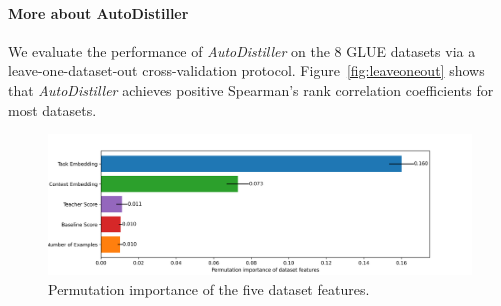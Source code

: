 \documentclass[11pt]{article}
\begin{document}

\paragraph{More about AutoDistiller} \label{sec:app:task_embedding}
We evaluate the performance of \emph{AutoDistiller} on the 8 GLUE datasets via a leave-one-dataset-out cross-validation protocol. Figure~\ref{fig:leaveoneout} shows that \emph{AutoDistiller} achieves positive Spearman's rank correlation coefficients for most datasets.

\begin{figure}[!tb]
    \centering
  \includegraphics[width=0.6\linewidth]{pics/permutation_importance.png}
  \caption{Permutation importance of the five dataset features.}
  \label{fig:permutation}
\end{figure}
\end{document}
